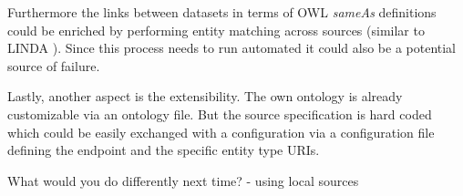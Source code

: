 Furthermore the links between datasets in terms of OWL \textit{sameAs} definitions could be enriched by performing entity matching across sources (similar to LINDA \cite{boehm_linda:_2012}). Since this process needs to run automated it could also be a potential source of failure. 

Lastly, another aspect is the extensibility. The own ontology is already customizable via an ontology file. But the source specification is hard coded which could be easily exchanged with a configuration via a configuration file defining the endpoint and the specific entity type URIs. 


What would you do differently next time?
- using local sources


